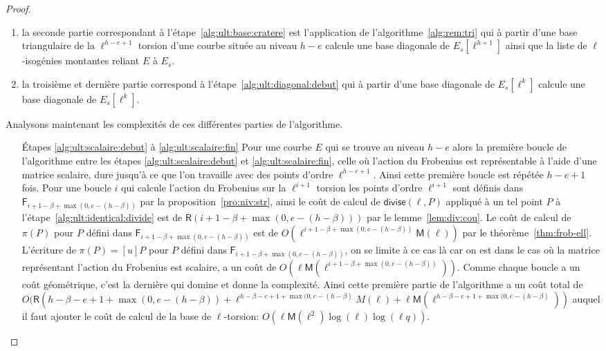 \documentclass[10pt,a4paper]{book}
\theoremstyle{plain}
\theoremstyle{definition}
\theoremstyle{definition}
\theoremstyle{definition}
\theoremstyle{definition}
\theoremstyle{remark}
\theoremstyle{remark}
\theoremstyle{definition}
\begin{document}
\begin{proof}
\begin{enumerate}
\item la seconde partie correspondant à l'étape~\ref{alg:ult:base:cratere} est
l'application de l'algorithme~\ref{alg:rem:tri} qui à partir d'une base 
triangulaire de la $\ell^{h-e+1}$ torsion d'une courbe située au niveau $h-e$
calcule une base diagonale de $E_s[\ell^{h+1}]$ ainsi que la liste de
$\ell$-isogénies montantes reliant $E$ à $E_s$.
\item la troisième et dernière partie correspond à 
l'étape~\ref{alg:ult:diagonal:debut} qui à partir d'une base diagonale de 
$E_s[\ell^k]$ calcule une base diagonale de $E_s[\ell^k]$.
\end{enumerate}
Analysons maintenant les complexités de ces différentes parties de 
l'algorithme.
\begin{enumerate}
\item[\'Etapes \ref{alg:ult:scalaire:debut} à \ref{alg:ult:scalaire:fin}]
Pour une courbe $E$ qui se trouve au niveau $h-e$ alors la première boucle de l'algorithme entre les étapes \ref{alg:ult:scalaire:debut} et \ref{alg:ult:scalaire:fin}, celle où l'action du 
Frobenius est représentable à l'aide d'une matrice scalaire, dure jusqu'à ce 
que l'on travaille avec des points d'ordre $\ell^{h-e+1}$. Ainsi cette première
 boucle est répétée $h-e+1$ fois. Pour une boucle $i$ qui calcule l'action du 
 Frobenius sur la $\ell^{i+1}$ torsion les points d'ordre $\ell^{i+1}$ 
sont définis dans $\mathsf{F}_{i+1-\beta+\max(0,e-(h-\beta))}$ par la 
proposition~\ref{pro:niv:str}, ainsi le coût de calcul de 
$\mathsf{divise}(\ell,P)$ appliqué à un tel point $P$ à 
l'étape~\ref{alg:ult:identical:divide} est de $\mathsf{R}(i+1-\beta+\max(0,e-
(h-\beta)))$ par le lemme~\ref{lem:div:cou}. Le coût de calcul de $\pi(P)$ pour
$P$ défini dans $\mathsf{F}_{i+1-\beta+\max(0,e-(h-\beta))}$ est de 
$O(\ell^{i+1-\beta+\max(0,e-(h-\beta))}\mathsf{M}(\ell))$ par le 
théorème~\ref{thm:frob-ell}. L'écriture de $\pi(P)=[u]P$ pour $P$ défini dans 
$\mathsf{F}_{i+1-\beta+\max(0,e-(h-\beta))}$, on se limite à ce cas là car on 
est dans le cas où la matrice représentant l'action du Frobenius est scalaire, 
a un coût de $O(\ell \mathsf{M}(\ell^{i+1- \beta+\max(0,e-(h-\beta))}))$. Comme
chaque boucle a un coût géométrique, c'est la dernière qui domine et donne la 
complexité. Ainsi cette première partie de l'algorithme a un coût 
 total de $O(\mathsf{R}(h-\beta-e+1 +\max(0,e-(h-\beta))+\ell^{h-\beta-e+1+
\max(0,e-(h-\beta)}M(\ell)+\ell\mathsf{M}(\ell^{h-\beta-e+1+
\max(0,e-(h-\beta)}))$ auquel il faut ajouter le coût de calcul de la base de 
$\ell$-torsion: $O(\ell\mathsf{M}(\ell^2)\log(\ell)\log(\ell q))$.


\end{enumerate}
\end{proof}
\end{document}

